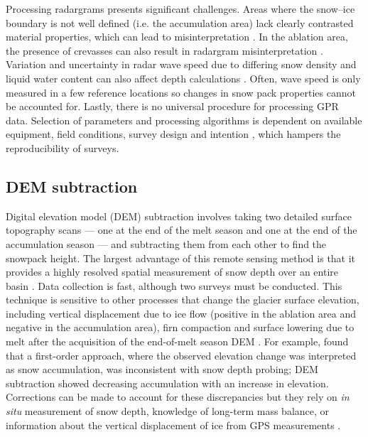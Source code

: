\documentclass{sfuthesis}
\begin{document}
\begin{appendices}
Processing radargrams presents significant challenges. Areas where the snow--ice boundary is not well defined (i.e. the accumulation area) lack clearly contrasted material properties, which can lead to misinterpretation \citep{McGrath2015}. In the ablation area, the presence of crevasses can also result in radargram misinterpretation \citep{Machguth2006}. Variation and uncertainty in radar wave speed due to differing snow density and liquid water content can also affect depth calculations \citep{Sold2013}. Often, wave speed is only measured in a few reference locations so changes in snow pack properties cannot be accounted for. Lastly, there is no universal procedure for processing GPR data. Selection of parameters and processing algorithms is dependent on available equipment, field conditions, survey design and intention \citep{Sold2013}, which hampers the reproducibility of surveys.

\subsection{DEM subtraction}

Digital elevation model (DEM) subtraction involves taking two detailed surface topography scans --- one at the end of the melt season and one at the end of the accumulation season --- and subtracting them from each other to find the snowpack height. The largest advantage of this remote sensing method is that it provides a highly resolved spatial measurement of snow depth over an entire basin \citep{Deems2006, Sold2013}. Data collection is fast, although two surveys must be conducted. This technique is sensitive to other processes that change the glacier surface elevation, including vertical displacement due to ice flow (positive in the ablation area and negative in the accumulation area), firn compaction and surface lowering due to melt after the acquisition of the end-of-melt season DEM \citep{Sold2013}. For example, \cite{Sold2013} found that a first-order approach, where the observed elevation change was interpreted as snow accumulation, was inconsistent with snow depth probing; DEM subtraction showed decreasing accumulation with an increase in elevation. Corrections can be made to account for these discrepancies but they rely on \textit{in situ} measurement of snow depth, knowledge of long-term mass balance, or information about the vertical displacement of ice from GPS measurements \citep{Sold2013}. 


\end{appendices}
\end{document}
